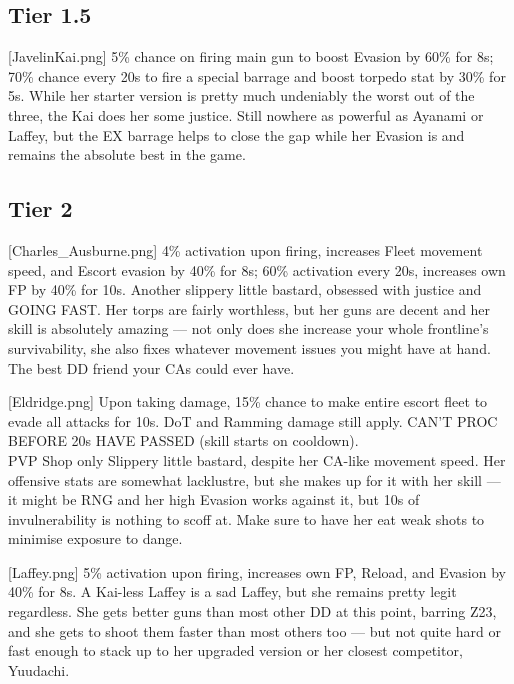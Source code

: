  
\newpage
\subsection{Tier 1.5}
[JavelinKai.png]
{5\% chance on firing main gun to boost Evasion by 60\% for 8s; 70\% chance every 20s to fire a special barrage and boost torpedo stat by 30\% for 5s.}
{}
{While her starter version is pretty much undeniably the worst out of the three, the Kai does her some justice. Still nowhere as powerful as Ayanami or Laffey, but the EX barrage helps to close the gap while her Evasion is and remains the absolute best in the game.}


\newpage
\subsection{Tier 2}
[Charles_Ausburne.png]
{4\% activation upon firing, increases Fleet movement speed, and Escort evasion by 40\% for 8s; 60\% activation every 20s, increases own FP by 40\% for 10s.}
{}
{Another slippery little bastard, obsessed with justice and GOING FAST. Her torps are fairly worthless, but her guns are decent and her skill is absolutely amazing --- not only does she increase your whole frontline's survivability, she also fixes whatever movement issues you might have at hand. The best DD friend your CAs could ever have.}

[Eldridge.png]
{Upon taking damage, 15\% chance to make entire escort fleet to evade all attacks for 10s. DoT and Ramming damage still apply. CAN'T PROC BEFORE 20s HAVE PASSED (skill starts on cooldown).\\
PVP Shop only}
{}
{Slippery little bastard, despite her CA-like movement speed. Her offensive stats are somewhat lacklustre, but she makes up for it with her skill --- it might be RNG and her high Evasion works against it, but 10s of invulnerability is nothing to scoff at. Make sure to have her eat weak shots to minimise exposure to dange.}

[Laffey.png]
{5\% activation upon firing, increases own FP, Reload, and Evasion by 40\% for 8s.}
{}
{A Kai-less Laffey is a sad Laffey, but she remains pretty legit regardless. She gets better guns than most other DD at this point, barring Z23, and she gets to shoot them faster than most others too --- but not quite hard or fast enough to stack up to her upgraded version or her closest competitor, Yuudachi.}
 
